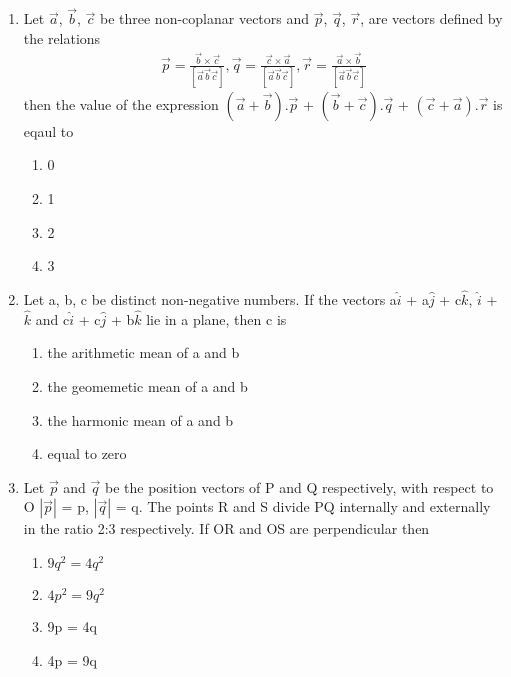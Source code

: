 \begin{enumerate}[label=\arabic*.,ref=\thesubsection.\theenumi]
\item Let $\overrightarrow{a}$, $\overrightarrow{b}$, $\overrightarrow{c}$ be three non-coplanar vectors and $\overrightarrow{p}$, $\overrightarrow{q}$, $\overrightarrow{r}$, are vectors defined by the relations 
\begin{align*}
\overrightarrow{p} = \frac{\overrightarrow{b} \times \overrightarrow{c}}{[\overrightarrow{a}\overrightarrow{b}\overrightarrow{c}]}, \overrightarrow{q} = \frac{\overrightarrow{c} \times \overrightarrow{a}}{[\overrightarrow{a}\overrightarrow{b}\overrightarrow{c}]}, \overrightarrow{r} = \frac{\overrightarrow{a} \times \overrightarrow{b}}{[\overrightarrow{a}\overrightarrow{b}\overrightarrow{c}]}
\end{align*}
then the value of the expression $(\overrightarrow{a} + \overrightarrow{b}).\overrightarrow{p}$ + $(\overrightarrow{b} + \overrightarrow{c}).\overrightarrow{q}$ + $(\overrightarrow{c} + \overrightarrow{a}).\overrightarrow{r}$ is eqaul to
\begin{enumerate}
\item 0
\item 1
\item 2
\item 3
\end{enumerate}

\item Let a, b, c be distinct non-negative numbers. If the vectors a$\hat{i}$ + a$\hat{j}$ + c$\hat{k}$, 
$\hat{i}$ + $\hat{k}$ and c$\hat{i}$ + c$\hat{j}$ + b$\hat{k}$ lie in a plane, then c is
\begin{enumerate}
\item the arithmetic mean of a and b
\item the geomemetic mean of a and b
\item the harmonic mean of a and b
\item equal to zero
\end{enumerate}

\item Let $\overrightarrow{p}$ and $\overrightarrow{q}$ be the position vectors of P and Q respectively, with respect to O $|\overrightarrow{p}|$ = p, $|\overrightarrow{q}|$ = q. The points R and S divide PQ internally and externally in the ratio 2:3 respectively. If OR and OS are perpendicular then
\begin{enumerate}
\item $9q^{2} = 4q^{2}$
\item $4p^{2} = 9q^{2}$
\item 9p = 4q
\item 4p = 9q
\end{enumerate}


\end{enumerate}
